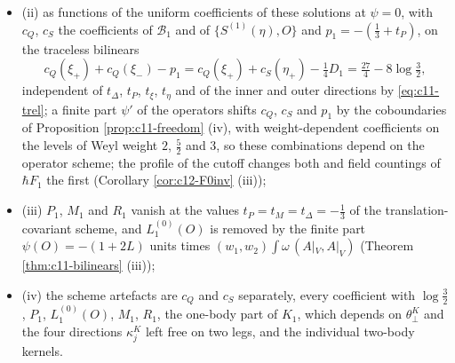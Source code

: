 \begin{corollary}
\begin{itemize}
\item (ii) as functions of the uniform coefficients of these solutions at $\psi=0$, with $c_Q$, $c_S$ the coefficients of $\mathcal B_1$ and of $\{S^{(1)}(\eta),O\}$ and $p_1=-(\tfrac13+t_P)$, on the traceless bilinears
\[
c_Q(\xi_+)+c_Q(\xi_-)-p_1=c_Q(\xi_+)+c_S(\eta_+)-\tfrac14D_1=\tfrac{27}4-8\log\tfrac32,
\]
independent of $t_\Delta$, $t_P$, $t_\xi$, $t_\eta$ and of the inner and outer directions by \eqref{eq:c11-trel}; a finite part $\psi'$ of the operators shifts $c_Q$, $c_S$ and $p_1$ by the coboundaries of Proposition \ref{prop:c11-freedom} (iv), with weight-dependent coefficients on the levels of Weyl weight $2$, $\tfrac52$ and $3$, so these combinations depend on the operator scheme; the profile of the cutoff changes both and field countings of $\hbar F_1$ the first (Corollary \ref{cor:c12-F0inv} (iii));
\item (iii) $P_1$, $M_1$ and $R_1$ vanish at the values $t_P=t_M=t_\Delta=-\tfrac13$ of the translation-covariant scheme, and $L_1^{(0)}(O)$ is removed by the finite part $\psi(O)=-(1+2L)$ units times $(w_1,w_2)\int\omega\,(A|_V,A|_V)$ (Theorem \ref{thm:c11-bilinears} (iii));
\item (iv) the scheme artefacts are $c_Q$ and $c_S$ separately, every coefficient with $\log\tfrac32$, $P_1$, $L_1^{(0)}(O)$, $M_1$, $R_1$, the one-body part of $K_1$, which depends on $\theta^K_\perp$ and the four directions $\kappa^K_j$ left free on two legs, and the individual two-body kernels.
\end{itemize}
\end{corollary}

